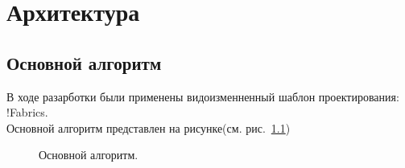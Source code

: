 
\chapter{Архитектура}

\section{Основной алгоритм}
В ходе разарботки были применены видоизменненный шаблон проектирования: !Fabrics.\\
Основной алгоритм представлен на рисунке(см. рис.~\ref{ris:alg_main})

\begin{figure}[h]
\caption{Основной алгоритм.}
\label{ris:alg_main}
\end{figure}



